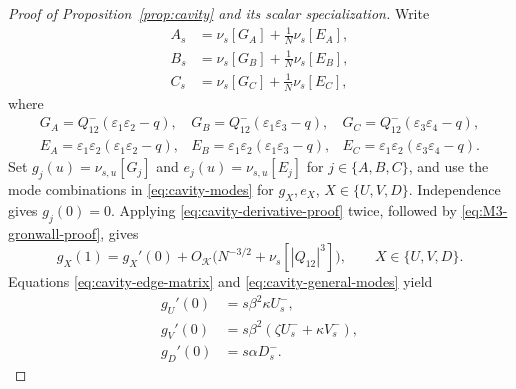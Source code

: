 \documentclass[11pt]{article}
\numberwithin{equation}{section}
\newcommand{\1}{\mathbf 1}
\newcommand{\cK}{\mathcal K}
\begin{document}
\begin{proof}[Proof of Proposition~\ref{prop:cavity} and its scalar specialization]
Write
\begin{align}
 A_s&=\nu_s[G_A]+\frac1N\nu_s[E_A],\nonumber\\
 B_s&=\nu_s[G_B]+\frac1N\nu_s[E_B],\nonumber\\
 C_s&=\nu_s[G_C]+\frac1N\nu_s[E_C],
 \label{eq:cavity-decomposition-proof}
\end{align}
where
\[
 \begin{array}{lll}
 G_A=Q^-_{12}(\varepsilon_1\varepsilon_2-q),&
 G_B=Q^-_{12}(\varepsilon_1\varepsilon_3-q),&
 G_C=Q^-_{12}(\varepsilon_3\varepsilon_4-q),\\
 E_A=\varepsilon_1\varepsilon_2(\varepsilon_1\varepsilon_2-q),&
 E_B=\varepsilon_1\varepsilon_2(\varepsilon_1\varepsilon_3-q),&
 E_C=\varepsilon_1\varepsilon_2(\varepsilon_3\varepsilon_4-q).
 \end{array}
\]
Set $g_j(u)=\nu_{s,u}[G_j]$ and $e_j(u)=\nu_{s,u}[E_j]$ for
$j\in\{A,B,C\}$, and use the mode combinations in
\eqref{eq:cavity-modes} for $g_X,e_X$, $X\in\{U,V,D\}$.
Independence gives $g_j(0)=0$.  Applying
\eqref{eq:cavity-derivative-proof} twice, followed by
\eqref{eq:M3-gronwall-proof}, gives
\begin{equation}
 g_X(1)=g_X'(0)
 +O_{\cK}\bigl(N^{-3/2}+\nu_s[|Q_{12}|^3]\bigr),
 \qquad X\in\{U,V,D\}.
 \label{eq:cavity-Taylor-modes}
\end{equation}
Equations \eqref{eq:cavity-edge-matrix} and
\eqref{eq:cavity-general-modes} yield
\begin{align}
 g_U'(0)&=s\beta^2\kappa U_s^-,\nonumber\\
 g_V'(0)&=s\beta^2(\zeta U_s^-+\kappa V_s^-),
 \label{eq:scalar-first-derivatives}\\
 g_D'(0)&=s\alpha D_s^-.\nonumber
\end{align}


\end{proof}
\end{document}
